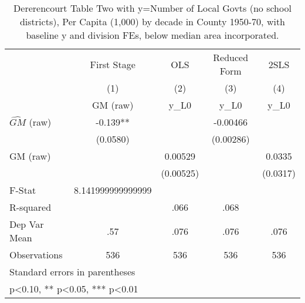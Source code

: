 \begin{table}[htbp]\centering
\def\sym#1{\ifmmode^{#1}\else\(^{#1}\)\fi}
\caption{Dererencourt Table Two with y=Number of Local Govts (no school districts), Per Capita (1,000) by decade in County 1950-70, with baseline y and division FEs, below median area incorporated.}
\begin{tabular}{l*{4}{c}}
\toprule
                    & First Stage   &         OLS   &Reduced Form   &        2SLS   \\
                    &\multicolumn{1}{c}{(1)}&\multicolumn{1}{c}{(2)}&\multicolumn{1}{c}{(3)}&\multicolumn{1}{c}{(4)}\\
                    &\multicolumn{1}{c}{GM  (raw)}&\multicolumn{1}{c}{y\_L0}&\multicolumn{1}{c}{y\_L0}&\multicolumn{1}{c}{y\_L0}\\
\midrule
$\hat{GM}$ (raw)    &      -0.139** &               &    -0.00466   &               \\
                    &    (0.0580)   &               &   (0.00286)   &               \\
\addlinespace
GM  (raw)           &               &     0.00529   &               &      0.0335   \\
                    &               &   (0.00525)   &               &    (0.0317)   \\
\midrule
F-Stat              &8.141999999999999   &               &               &               \\
R-squared           &               &        .066   &        .068   &               \\
Dep Var Mean        &         .57   &        .076   &        .076   &        .076   \\
Observations        &         536   &         536   &         536   &         536   \\
\bottomrule
\multicolumn{5}{l}{\footnotesize Standard errors in parentheses}\\
\multicolumn{5}{l}{\footnotesize * p<0.10, ** p<0.05, *** p<0.01}\\
\end{tabular}
\end{table}
